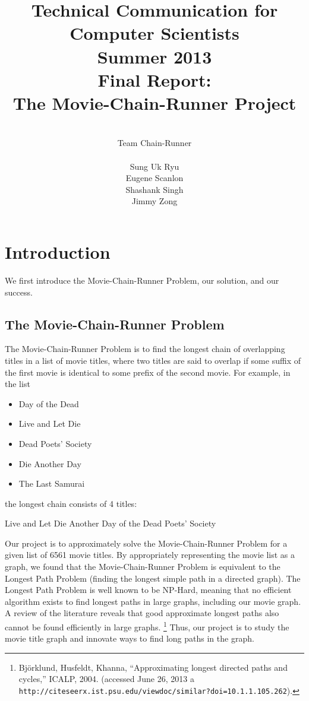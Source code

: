 \documentclass[11pt,english]{article}
\title{
{\normalsize \bf Technical Communication for Computer Scientists\\
Summer 2013}\\
\vspace{4cm}
{\bf Final Report:\\The Movie-Chain-Runner Project}}
\author{
\\Team Chain-Runner \\\\
Sung Uk Ryu\\
Eugene Scanlon\\
Shashank Singh\\
Jimmy Zong
}
\begin{document}


\tableofcontents

\newpage
{} %
\section{Introduction}
We first introduce the Movie-Chain-Runner Problem, our solution, and our
success.

\subsection{The Movie-Chain-Runner Problem}
The Movie-Chain-Runner Problem is to find the longest chain of overlapping
titles in a list of movie titles, where two titles are said to overlap if some
suffix of the first movie is identical to some prefix of the second movie. For
example, in the list
\begin{itemize}[noitemsep]
\item Day of the Dead
\item Live and Let Die
\item Dead Poets' Society
\item Die Another Day
\item The Last Samurai
\end{itemize}
the longest chain consists of 4 titles:

\begin{center}
Live and Let Die Another Day of the Dead Poets' Society
\end{center}

Our project is to approximately solve the Movie-Chain-Runner Problem for a
given list of 6561 movie titles.
By appropriately representing the movie list as a graph, we found that the
Movie-Chain-Runner Problem is equivalent to the Longest Path Problem
(finding the longest simple path in a directed graph). The Longest Path Problem
is well known to be NP-Hard, meaning that no efficient algorithm exists to find
longest paths in large graphs, including our movie graph. A review of the
literature reveals that good approximate longest paths also cannot be found
efficiently in large graphs.\hspace{-0.2cm}
\footnote{
Bj\"{o}rklund, Husfeldt, Khanna, ``Approximating longest directed
paths and cycles,'' ICALP, 2004. (accessed June 26, 2013 a
\texttt{
http://citeseerx.ist.psu.edu/viewdoc/similar?doi=10.1.1.105.262}).}
Thus, our project is to study the movie title graph and innovate ways to find
long paths in the graph.
\end{document}
